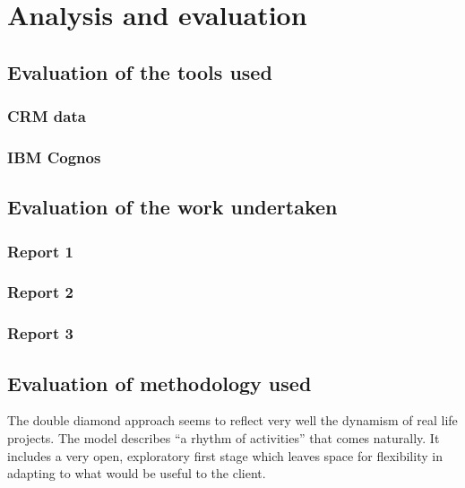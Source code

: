 
\chapter{Analysis and evaluation}

	\section{Evaluation of the tools used}

		\subsection{CRM data}
		
		\subsection{IBM Cognos}

	\section{Evaluation of the work undertaken}

		\subsection{Report 1}
		
		\subsection{Report 2}
		
		\subsection{Report 3}
		
	\section{Evaluation of methodology used}

The double diamond approach seems to reflect very well the dynamism of real life projects. The model describes “a rhythm of activities” that comes naturally. It includes a very open, exploratory first stage which leaves space for flexibility in adapting to what would be useful to the client.


